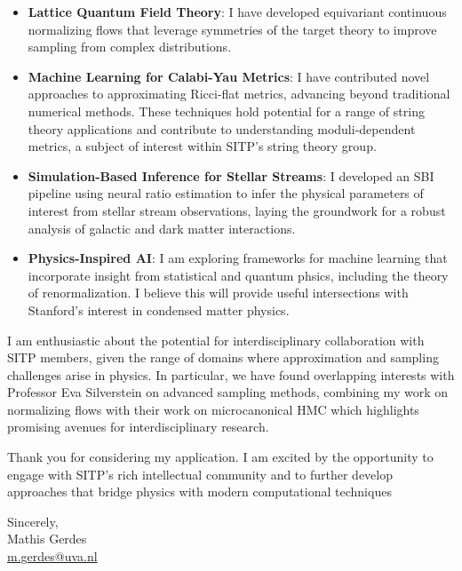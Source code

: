 \documentclass[11pt]{article}
\begin{document}
\begin{itemize}
    \item \textbf{Lattice Quantum Field Theory}: I have developed equivariant continuous normalizing flows that leverage symmetries of the target theory to improve sampling from complex distributions.
    \item \textbf{Machine Learning for Calabi-Yau Metrics}: I have contributed novel approaches to approximating Ricci-flat metrics, advancing beyond traditional numerical methods. These techniques hold potential for a range of string theory applications and contribute to understanding moduli-dependent metrics, a subject of interest within SITP's string theory group.
    \item \textbf{Simulation-Based Inference for Stellar Streams}: I developed an SBI pipeline using neural ratio estimation to infer the physical parameters of interest from stellar stream observations, laying the groundwork for a robust analysis of galactic and dark matter interactions.
    \item \textbf{Physics-Inspired AI}: I am exploring frameworks for machine learning that incorporate insight from statistical and quantum phsics, including the theory of renormalization. I believe this will provide useful intersections with Stanford's interest in condensed matter physics.
\end{itemize}

I am enthusiastic about the potential for interdisciplinary collaboration with SITP members, given the range of domains where approximation and sampling challenges arise in physics. In particular, we have found overlapping interests with Professor Eva Silverstein on advanced sampling methods, combining my work on normalizing flows with their work on microcanonical HMC which highlights promising avenues for interdisciplinary research.

Thank you for considering my application. I am excited by the opportunity to engage with SITP's rich intellectual community and to further develop approaches that bridge physics with modern computational techniques

\noindent
\flushright
Sincerely, \\
Mathis Gerdes \\
\href{mailto:m.gerdes@uva.nl}{m.gerdes@uva.nl}
\end{document}
